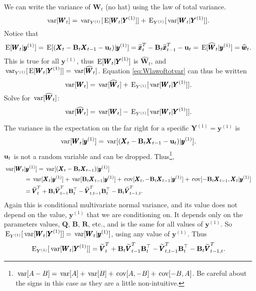 \documentclass[]{article}
\def\UPS{\mbox{\boldmath $\Upsilon$}}
\def\BB{\mbox{$\mathbf B$}}	\def\bb{\mbox{$\mathbf b$}} \def\Bb{\mbox{$\mathbf J$}} \def\Ba{\mbox{$\mathbf L$}} \def\Bm{\UPS}
\def\E{\,\textup{\textrm{E}}}
\def\QQ{\mbox{$\mathbf Q$}}	 \def\qq{\mbox{$\mathbf q$}} \def\Qb{\mbox{$\mathbf G$}}  \def\Qm{\mathbb{Q}}
\def\RR{\mbox{$\mathbf R$}}	 \def\rr{\mbox{$\mathbf r$}} \def\Rb{\mbox{$\mathbf H$}}	\def\Rm{\mathbb{R}}
\def\VV{\mbox{$\pmb{V}$}}	\def\vv{\mbox{$\pmb{v}$}}
\def\WW{\mbox{$\pmb{W}$}}	\def\ww{\mbox{$\pmb{w}$}}
\def\XX{\mbox{$\pmb{X}$}}	\def\xx{\mbox{$\pmb{x}$}}
\def\YY{\mbox{$\pmb{Y}$}}	\def\yy{\mbox{$\pmb{y}$}}
\def\var{\,\textup{\textrm{var}}}
\def\cov{\,\textup{\textrm{cov}}}
\def\hatxtT{\widetilde{\xx}_t^T}
\def\hatxtmT{\widetilde{\xx}_{t-1}^T}
\def\hatWt{\widehat{\WW}_t}
\def\hatwt{\widehat{\ww}_t}
\def\hatVtT{\widetilde{\VV}_t^T}
\def\hatVtmT{\widetilde{\VV}_{t-1}^T}
\def\hatVttmT{\widetilde{\VV}_{t,t-1}^T}
\def\hatVtmtT{\widetilde{\VV}_{t-1,t}^T}
\begin{document}
We can write the variance of $\WW_t$ (no hat) using the law of total variance.
\begin{equation}\label{eq:Wlawoftotvar}
\var[\WW_t] = \var_{Y^{(1)}}[\E[\WW_t|\YY^{(1)}]] + \E_{Y^{(1)}}[\var[\WW_t|\YY^{(1)}]] .
\end{equation}
Notice that
\begin{equation}
\E[\WW_t|\yy^{(1)}] = \E[(\XX_t - \BB_t \XX_{t-1} - \uu_t)|\yy^{(1)}] =  \hatxtT - \BB_t \hatxtmT - \uu_t = \E[\hatWt|\yy^{(1)}] = \hatwt .
\end{equation}
This is true for all $\yy^{(1)}$, thus $\E[\WW_t|\YY^{(1)}]$ is $\hatWt$, and $\var_{Y^{(1)}}[\E[\WW_t|\YY^{(1)}]] = \var[\hatWt]$. Equation \ref{eq:Wlawoftotvar} can thus be written
\begin{equation}
\var[\WW_t] = \var[\hatWt] + \E_{Y^{(1)}}[\var[\WW_t|\YY^{(1)}]] .
\end{equation}
Solve for $\var[\hatWt]$:
\begin{equation}\label{eq:varwwt}
\var[\hatWt] = \var[\WW_t] - \E_{Y^{(1)}}[\var[\WW_t|\YY^{(1)}]].
\end{equation}

The variance in the expectation on the far right for a specific $\YY^{(1)}=\yy^{(1)}$ is
\begin{equation}
\var[\WW_t|\yy^{(1)}] = \var[ (\XX_t - \BB_t\XX_{t-1}-\uu_t) | \yy^{(1)} ] .
\end{equation}
$\mbox{$\mathbf u$}_t$  is not a random variable and can be dropped. Thus\footnote{$\var[A-B]=\var[A]+\var[B]+\cov[A,-B]+\cov[-B,A]$. Be careful about the signs in this case as they are a little non-intuitive.},
\begin{equation}\label{eq:var.W.cond.y1}
\begin{split}
\var[\WW_t&|\yy^{(1)}] = \var[ (\XX_t - \BB_t\XX_{t-1}) | \yy^{(1)} ] \\
& = \var[ \XX_t | \yy^{(1)} ] + \var[\BB_t\XX_{t-1} | \yy^{(1)} ] + \cov[\XX_t, -\BB_t\XX_{t-1} | \yy^{(1)} ] + \cov[ -\BB_t\XX_{t-1}, \XX_t | \yy^{(1)} ]\\
& = \hatVtT + \BB_t \hatVtmT \BB_t^\top - \hatVttmT\BB_t^\top - \BB_t\hatVtmtT .
\end{split}
\end{equation}
Again this is conditional multivariate normal variance, and its value does not depend on the value, $\yy^{(1)}$ that we are conditioning on.  It depends only on the parameters values, $\QQ$, $\BB$, $\RR$, etc., and is the same for all values of $\yy^{(1)}$. So $\E_{Y^{(1)}}[\var[\WW_t|\YY^{(1)}]] = \var[\WW_t|\yy^{(1)}]$, using any value of $\yy^{(1)}$. Thus
\begin{equation}\label{eq:E.var.Wt.yt}
\E_{Y^{(1)}}[\var[\WW_t|\YY^{(1)}]] =  \hatVtT + \BB_t\hatVtmT\BB_t^\top - \hatVttmT\BB_t^\top - \BB_t\hatVtmtT .
\end{equation}
\end{document}
